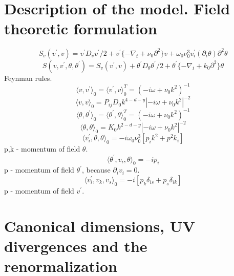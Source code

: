 \documentclass[12pt]{article}
\begin{document}

\section{Description of the model. Field theoretic formulation}
\label{sec:QFT}
\begin{equation}
    S_{v}(v^{'},v)=v^{'}D_{v}v^{'}/2+v^{'}\{-\nabla_{t}+\nu_{0}\partial^2\}v+\omega_{0}\nu_{0}^{3}v^{'}_{i}(\partial_{i}\theta)\partial^{2}\theta
\end{equation}
\begin{equation}
S(v,v^{'},\theta,\theta^{'}) = S_{v}(v^{'},v)+\theta^{'}D_{\theta}\theta^{'}/2+\theta^{'}\{-\nabla_{t}+k_{0}\partial^{2}\}\theta
\end{equation}
Feynman rules.
\begin{equation}
\langle v,v^{'} \rangle_{0}=\langle v^{'},v \rangle _{0}^{T}=(-i\omega+\nu_{0}k^2)^{-1}
\end{equation}
\begin{equation}
\langle v,v \rangle_{0}=P_{ij}D_{0}k^{4-d-y}|-i\omega+\nu_{0}k^2|^{-2}
\end{equation}
\begin{equation}
\langle \theta,\theta^{'} \rangle_{0}=\langle \theta^{'},\theta \rangle _{0}^{T}=(-i\omega+\nu_{0}k^2)^{-1}
\end{equation}
\begin{equation}
\langle \theta,\theta \rangle_{0}=K_{0}k^{2-d-y}|-i\omega+\nu_{0}k^2|^{-2}
\end{equation}
\begin{equation}
    \langle v_{i}^{'}, \theta,\theta \rangle_{0}= -i\omega_{0}\nu_{0}^{3}[p_i k^2+p^2 k_i]
\end{equation}
p,k - momentum of field $\theta$.
\begin{equation}
\langle \theta^{'}, v_i ,\theta \rangle_{0}= -ip_i
\end{equation}
p - momentum of field $\theta^{'}$, because $\partial_i v_i=0$.
\begin{equation}
\langle v^{'}_i, v_k ,v_s \rangle_{0}= -i[p_k \delta_{is}+ p_s \delta_{ik}]
\end{equation}
p - momentum of field $v^{'}$.
\section{Canonical dimensions, UV divergences and the renormalization}
\label{sec:Reno}
\end{document}
